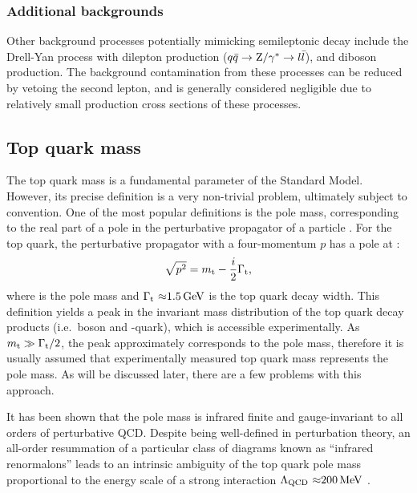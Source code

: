 \subsubsection*{Additional backgrounds}
Other background processes potentially mimicking semileptonic \ttbar decay include the Drell-Yan process with dilepton
production ($q \bar{q} \rightarrow \mathrm{Z}/\gamma^* \rightarrow l \bar{l}$), and diboson production. The background
contamination from these processes can be reduced by vetoing the second lepton, and is generally considered negligible
due to relatively small production cross sections of these processes.


\subsection{Top quark mass}
\label{ss:top_mass}
The top quark mass is a fundamental parameter of the Standard Model. However, its precise definition is a very
non-trivial problem, ultimately subject to convention. One of the most popular definitions is the pole mass,
corresponding to the real part of a pole in the perturbative propagator of a particle
\autocite{pole_mass_in_QCD_Tarrach}. For the top quark, the perturbative propagator with a four-momentum $p$ has a pole
at \autocite{top_pole_mass}:
\begin{equation}
\sqrt{p^2} = m_\mathrm{t} - \frac{i}{2} \Gamma_\textrm{t},
\end{equation}
where \mtop is the pole mass and $\Gamma_\textrm{t}~\SI{\approx1.5}{\GeV}$ is the top quark decay width. This definition
yields a peak in the invariant mass distribution of the top quark decay products (i.e.\ \W boson and \cPqb-quark), which
is accessible experimentally. As $m_\mathrm{t} \gg \Gamma_\textrm{t}/2$, the peak approximately corresponds to the pole mass,
therefore it is usually assumed that experimentally measured top quark mass represents the pole mass. As will be
discussed later, there are a few problems with this approach.

It has been shown \autocite{pole_mass_in_QCD_Kronfeld} that the pole mass is infrared finite and gauge-invariant to all
orders of perturbative QCD. Despite being well-defined in perturbation theory, an all-order resummation of a particular
class of diagrams known as ``infrared renormalons'' \autocite{renormalons1, renormalons2} leads to an intrinsic
ambiguity of the top quark pole mass proportional to the energy scale of a strong interaction
$\Lambda_\textrm{QCD}~\SI{\approx200}{\MeV}$
\autocite{pole_MS_top_difference}.

